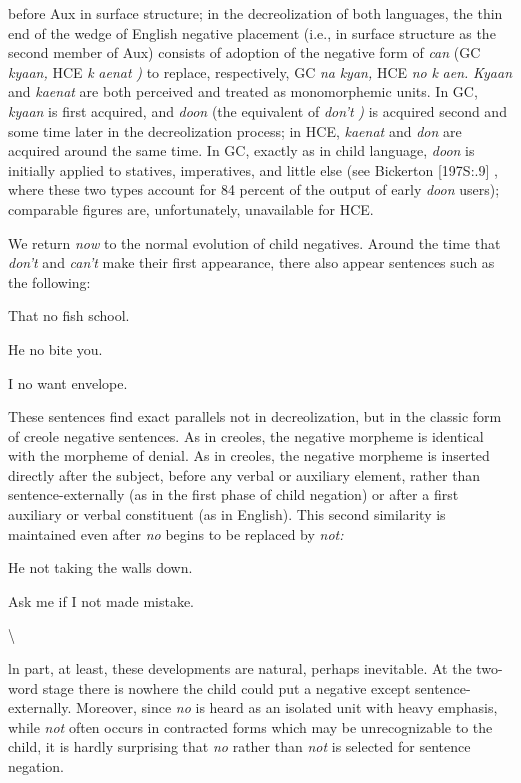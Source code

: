 
before Aux in surface structure; in the decreolization of both languages, the thin end of the wedge of English negative placement (i.e., in surface structure as the second member of Aux) consists of adoption of the negative form of \textit{can} (GC \textit{kyaan,} HCE \textit{k} \textit{aenat} \textit{)} to replace, respectively, GC \textit{na} \textit{kyan,} HCE \textit{no} \textit{k} \textit{aen.} \textit{Kyaan} and \textit{kaenat} are both perceived and treated as monomorphemic units. In GC, \textit{kyaan} is first acquired, and \textit{doon} (the equivalent of \textit{don't} \textit{)} is acquired second and some time later in the decreolization process; in HCE, \textit{kaenat} and \textit{don} are acquired around the same time. In GC, exactly as in child language, \textit{doon} is initially applied to statives, imperatives, and little else (see Bickerton [197S:.9] , where these two types account for 84 percent of the output of early \textit{doon} users); comparable figures are, unfortunately, unavailable for HCE.

We return \textit{now} to the normal evolution of child negatives. Around the time that \textit{don't} and \textit{can't} make their first appearance, there also appear sentences such as the following:

\ea\label{ex:58}
 That no fish school.
\glt
\z

\ea\label{ex:59}
 He no bite you.
\glt
\z

\ea\label{ex:60}
 I no want envelope.
\glt
\z

These sentences find exact parallels not in decreolization, but in the classic form of creole negative sentences. As in creoles, the negative morpheme is identical with the morpheme of denial. As in creoles, the negative morpheme is inserted directly after the subject, before any verbal or auxiliary element, rather than sentence-externally (as in the first phase of child negation) or after a first auxiliary or verbal constituent (as in English). This second similarity is maintained even after \textit{no} begins to be replaced by \textit{not:}

\ea\label{ex:61}
 He not taking the walls down.
\glt
\z

\ea\label{ex:62}
 Ask me if I not made mistake.
\glt
\z

{\textbackslash}


ln part, at least, these developments are natural, perhaps inevit\-able. At the two-word stage there is nowhere the child could put a negative except sentence-externally. Moreover, since \textit{no} is heard as an isolated unit with heavy emphasis, while \textit{not} often occurs in contracted forms which may be unrecognizable to the child, it is hardly surprising that \textit{no} rather than \textit{not} is selected for sentence negation.

